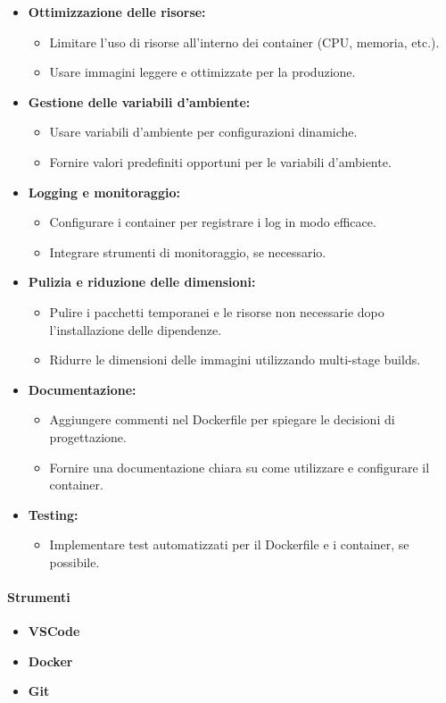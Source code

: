 \begin{itemize}
\item \textbf{Ottimizzazione delle risorse:}
    \begin{itemize}
        \item Limitare l'uso di risorse all'interno dei container (CPU, memoria, etc.).
        \item Usare immagini leggere e ottimizzate per la produzione.
    \end{itemize}

\item \textbf{Gestione delle variabili d'ambiente:}
    \begin{itemize}
        \item Usare variabili d'ambiente per configurazioni dinamiche.
        \item Fornire valori predefiniti opportuni per le variabili d'ambiente.
    \end{itemize}

\item \textbf{Logging e monitoraggio:}
    \begin{itemize}
        \item Configurare i container per registrare i log in modo efficace.
        \item Integrare strumenti di monitoraggio, se necessario.
    \end{itemize}

\item \textbf{Pulizia e riduzione delle dimensioni:}
    \begin{itemize}
        \item Pulire i pacchetti temporanei e le risorse non necessarie dopo l'installazione delle dipendenze.
        \item Ridurre le dimensioni delle immagini utilizzando multi-stage builds.
    \end{itemize}

\item \textbf{Documentazione:}
    \begin{itemize}
        \item Aggiungere commenti nel Dockerfile per spiegare le decisioni di progettazione.
        \item Fornire una documentazione chiara su come utilizzare e configurare il container.
    \end{itemize}

\item \textbf{Testing:}
    \begin{itemize}
        \item Implementare test automatizzati per il Dockerfile e i container, se possibile.
    \end{itemize}
\end{itemize}
\paragraph{Strumenti}
\begin{itemize}
    \item \textbf{VSCode}
    \item \textbf{Docker}
    \item \textbf{Git}
\end{itemize}
